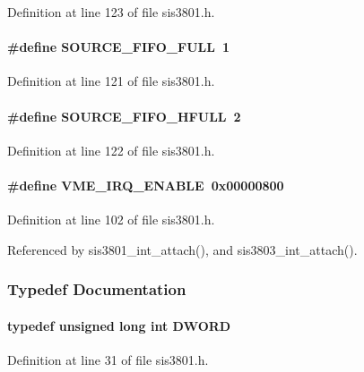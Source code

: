 Definition at line 123 of file sis3801.h.
\paragraph[{SOURCE\_\-FIFO\_\-FULL}]{\setlength{\rightskip}{0pt plus 5cm}\#define SOURCE\_\-FIFO\_\-FULL~1}\hfill\label{sis3801_8h_a9bd02e07df6be2dcc75f77654c3b369b}


Definition at line 121 of file sis3801.h.
\paragraph[{SOURCE\_\-FIFO\_\-HFULL}]{\setlength{\rightskip}{0pt plus 5cm}\#define SOURCE\_\-FIFO\_\-HFULL~2}\hfill\label{sis3801_8h_acba7195ba8f939f64574d456d52c5589}


Definition at line 122 of file sis3801.h.
\paragraph[{VME\_\-IRQ\_\-ENABLE}]{\setlength{\rightskip}{0pt plus 5cm}\#define VME\_\-IRQ\_\-ENABLE~0x00000800}\hfill\label{sis3801_8h_abe651a9664cbb258631e2fbc4501f200}


Definition at line 102 of file sis3801.h.

Referenced by sis3801\_\-int\_\-attach(), and sis3803\_\-int\_\-attach().

\subsubsection{Typedef Documentation}
\paragraph[{DWORD}]{\setlength{\rightskip}{0pt plus 5cm}typedef unsigned long int {\bf DWORD}}\hfill\label{sis3801_8h_a408a2366473807fbe658ba18e75dea66}


Definition at line 31 of file sis3801.h.

